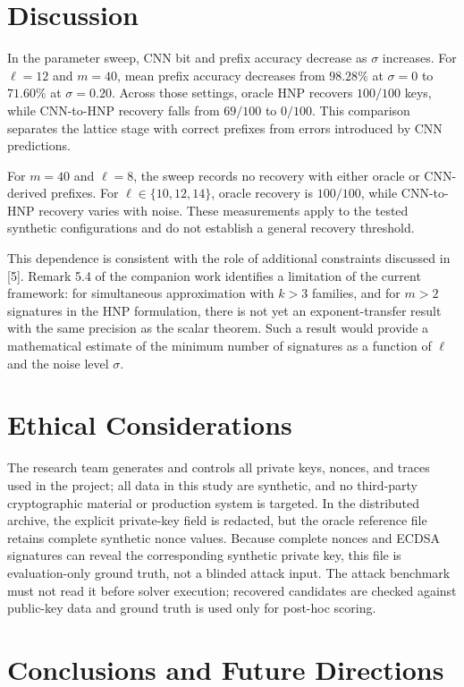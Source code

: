 \documentclass[11pt,a4paper]{article}
\begin{document}
\section{Discussion}

In the parameter sweep, CNN bit and prefix accuracy decrease as $\sigma$ increases. For $\ell=12$ and $m=40$, mean prefix accuracy decreases from $98.28\%$ at $\sigma=0$ to $71.60\%$ at $\sigma=0.20$. Across those settings, oracle HNP recovers $100/100$ keys, while CNN-to-HNP recovery falls from $69/100$ to $0/100$. This comparison separates the lattice stage with correct prefixes from errors introduced by CNN predictions.

For $m=40$ and $\ell=8$, the sweep records no recovery with either oracle or CNN-derived prefixes. For $\ell\in\{10,12,14\}$, oracle recovery is $100/100$, while CNN-to-HNP recovery varies with noise. These measurements apply to the tested synthetic configurations and do not establish a general recovery threshold.

This dependence is consistent with the role of additional constraints discussed in [5]. Remark 5.4 of the companion work identifies a limitation of the current framework: for simultaneous approximation with $k>3$ families, and for $m>2$ signatures in the HNP formulation, there is not yet an exponent-transfer result with the same precision as the scalar theorem. Such a result would provide a mathematical estimate of the minimum number of signatures as a function of $\ell$ and the noise level $\sigma$.

\section{Ethical Considerations}

The research team generates and controls all private keys, nonces, and traces used in the project; all data in this study are synthetic, and no third-party cryptographic material or production system is targeted. In the distributed archive, the explicit private-key field is redacted, but the oracle reference file retains complete synthetic nonce values. Because complete nonces and ECDSA signatures can reveal the corresponding synthetic private key, this file is evaluation-only ground truth, not a blinded attack input. The attack benchmark must not read it before solver execution; recovered candidates are checked against public-key data and ground truth is used only for post-hoc scoring.

\section{Conclusions and Future Directions}
\end{document}
